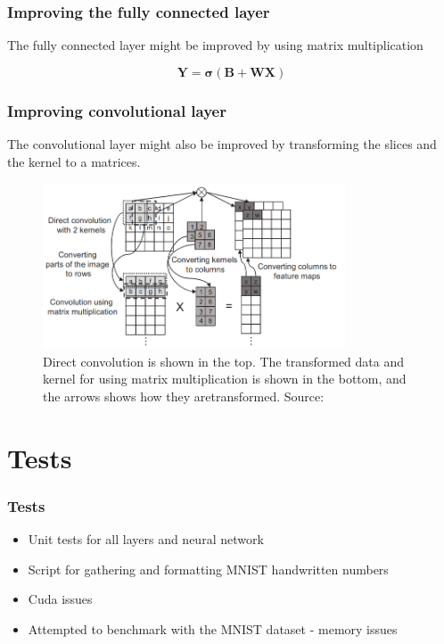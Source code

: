 \documentclass{beamer}
\begin{document}
%     

\begin{frame}[fragile]
    \frametitle{Improving the fully connected layer}
    
    The fully connected layer might be improved by using matrix multiplication

    $$\bm{Y} = \bm{\sigma} \left( \bm{B} + \bm{W} \bm{X} \right)$$
\end{frame}

\begin{frame}[fragile]
    \frametitle{Improving convolutional layer}
    
    The convolutional layer might also be improved by transforming the slices and the kernel to a matrices.

    \begin{figure}
        \centering
        \includegraphics[width=0.8\textwidth]{../assets/conv-matrix.png}
        \caption{Direct convolution is shown in the top. The transformed data and kernel for using matrix multiplication is shown in the bottom, and the arrows shows how they aretransformed. Source: \cite{perfomance_analysis_cnn}}
        \label{fig:conv_matrix}
    \end{figure}
\end{frame}

\section{Tests}

\begin{frame}
    \frametitle{Tests}

    \begin{itemize}
        \item Unit tests for all layers and neural network
        \item Script for gathering and formatting MNIST handwritten numbers
        \item Cuda issues
        \item Attempted to benchmark with the MNIST dataset - memory issues
    \end{itemize}
\end{frame}
\end{document}
